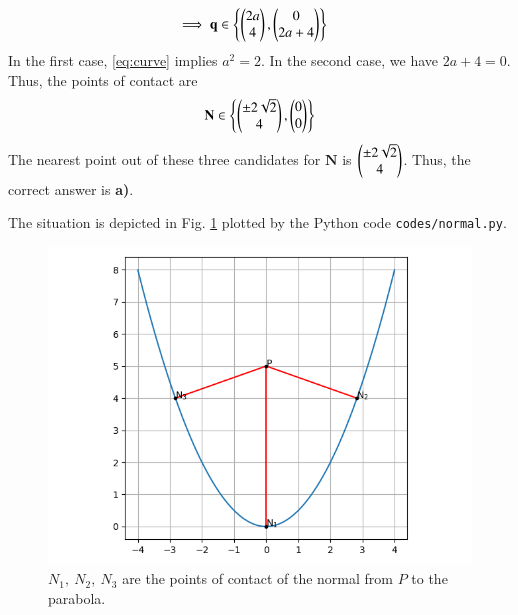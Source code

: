 \documentclass[journal,12pt,twocolumn]{IEEEtran}
\renewcommand{\vec}[1]{\boldsymbol{\mathbf{#1}}}
\begin{document}
\begin{enumerate}
\begin{align}
        \implies \vec{q} &\in \cbrak{\myvec{2a\\4},\myvec{0\\2a+4}}
        \label{eq:x-case}
    \end{align}
    In the first case, \eqref{eq:curve} implies $a^2 = 2$. In the second case,
    we have $2a + 4 = 0$. Thus, the points of contact are
    \begin{align}
        \vec{N} \in \cbrak{\myvec{\pm 2\sqrt{2}\\4},\myvec{0\\0}}
        \label{eq:poc-ans}
    \end{align}
    The nearest point out of these three candidates for $\vec{N}$ is
    $\begin{pmatrix}\pm2\sqrt{2}\\4\end{pmatrix}$. Thus, the correct answer is \textbf{a)}.

    The situation is depicted in Fig. \ref{fig:normal} plotted by the Python
    code \texttt{codes/normal.py}.
    \begin{figure}[!ht]
        \centering
        \includegraphics[width=\columnwidth]{figs/normal.png}
        \caption{$N_1,\ N_2,\ N_3$ are the points of contact of the normal from 
        $P$ to the parabola.}
        \label{fig:normal}
    \end{figure}
\end{enumerate}
\end{document}
